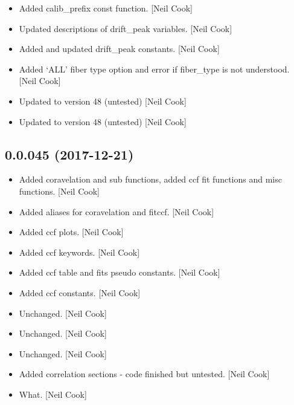 \documentclass[a4paper,10pt,english]{report}
\begin{document}
\begin{itemize}
\item {} 
Added calib\_prefix const function. {[}Neil Cook{]}

\item {} 
Updated descriptions of drift\_peak variables. {[}Neil Cook{]}

\item {} 
Added and updated drift\_peak constants. {[}Neil Cook{]}

\item {} 
Added ‘ALL’ fiber type option and error if fiber\_type is not
understood. {[}Neil Cook{]}

\item {} 
Updated to version 48 (untested) {[}Neil Cook{]}

\item {} 
Updated to version 48 (untested) {[}Neil Cook{]}

\end{itemize}


\subsection{0.0.045 (2017-12-21)}
\label{\detokenize{misc/changelog:id505}}\begin{itemize}
\item {} 
Added coravelation and sub functions, added ccf fit functions and misc
functions. {[}Neil Cook{]}

\item {} 
Added aliases for coravelation and fitccf. {[}Neil Cook{]}

\item {} 
Added ccf plots. {[}Neil Cook{]}

\item {} 
Added ccf keywords. {[}Neil Cook{]}

\item {} 
Added ccf table and fits pseudo constants. {[}Neil Cook{]}

\item {} 
Added ccf constants. {[}Neil Cook{]}

\item {} 
Unchanged. {[}Neil Cook{]}

\item {} 
Unchanged. {[}Neil Cook{]}

\item {} 
Unchanged. {[}Neil Cook{]}

\item {} 
Added correlation sections - code finished but untested. {[}Neil Cook{]}

\item {} 
What. {[}Neil Cook{]}

\end{itemize}
\end{document}
